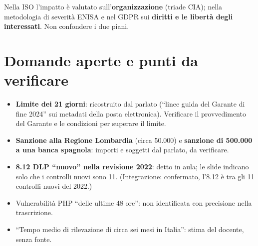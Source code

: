 \begin{esame}
Nella ISO l'impatto è valutato sull'\textbf{organizzazione} (triade CIA); nella metodologia di severità
ENISA e nel GDPR sui \textbf{diritti e le libertà degli interessati}. Non confondere i due piani.
\end{esame}

\section{Domande aperte e punti da verificare}
\begin{verifica}
\begin{itemize}
  \item \textbf{Limite dei 21 giorni}: ricostruito dal parlato (``linee guida del Garante di fine 2024''
    sui metadati della posta elettronica). Verificare il provvedimento del Garante e le condizioni per
    superare il limite.
  \item \textbf{Sanzione alla Regione Lombardia} (circa \texteuro{}50.000) e \textbf{sanzione di
    \texteuro{}500.000 a una banca spagnola}: importi e soggetti dal parlato, da verificare.
  \item \textbf{8.12 DLP ``nuovo'' nella revisione 2022}: detto in aula; le slide indicano solo che i
    controlli nuovi sono 11. (Integrazione: confermato, l'8.12 è tra gli 11 controlli nuovi del 2022.)
  \item Vulnerabilità PHP ``delle ultime 48 ore'': non identificata con precisione nella trascrizione.
  \item ``Tempo medio di rilevazione di circa sei mesi in Italia'': stima del docente, senza fonte.
\end{itemize}
\end{verifica}
